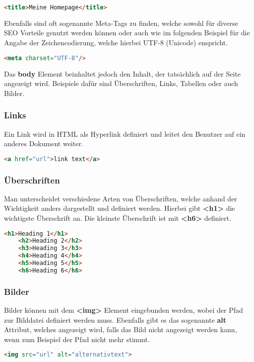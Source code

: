 \begin{lstlisting}[language=html]
    <title>Meine Homepage</title>
\end{lstlisting}

Ebenfalls sind oft sogenannte Meta-Tags zu finden, welche sowohl für diverse SEO Vorteile genutzt werden können oder auch wie im folgenden Beispiel für die Angabe der Zeichencodierung, welche hierbei UTF-8 (Unicode) enspricht.

\begin{lstlisting}[language=html]
    <meta charset="UTF-8"/>
\end{lstlisting}

Das \textbf{body} Element beinhaltet jedoch den Inhalt, der tatsächlich auf der Seite angezeigt wird. Beispiele dafür sind Überschriften, Links, Tabellen oder auch Bilder.

\cite{frontend_web_html}

\subsubsection{Links}
Ein Link wird in HTML als Hyperlink definiert und leitet den Benutzer auf ein anderes Dokument weiter.

\begin{lstlisting}[language=html]
    <a href="url">link text</a>
\end{lstlisting}

\cite{frontend_web_html_links}

\subsubsection{Überschriften}
Man unterscheidet verschiedene Arten von Überschriften, welche anhand der Wichtigkeit anders dargestellt und definiert werden. Hierbei gibt \textbf{<h1>} die wichtigste Überschrift an. Die kleinste Überschrift ist mit \textbf{<h6>} definiert.

\begin{lstlisting}[language=html]
    <h1>Heading 1</h1>
    <h2>Heading 2</h2>
    <h3>Heading 3</h3>
    <h4>Heading 4</h4>
    <h5>Heading 5</h5>
    <h6>Heading 6</h6>
\end{lstlisting}

\cite{frontend_web_html_überschriften}

\subsubsection{Bilder}
Bilder können mit dem \textbf{<img>} Element eingebunden werden, wobei der Pfad zur Bilddatei definiert werden muss. Ebenfalls gibt es das sogenannte \textbf{alt} Attribut, welches angezeigt wird, falls das Bild nicht angezeigt werden kann, wenn zum Beispiel der Pfad nicht mehr stimmt.

\begin{lstlisting}[language=html]
    <img src="url" alt="alternativtext">
\end{lstlisting}




